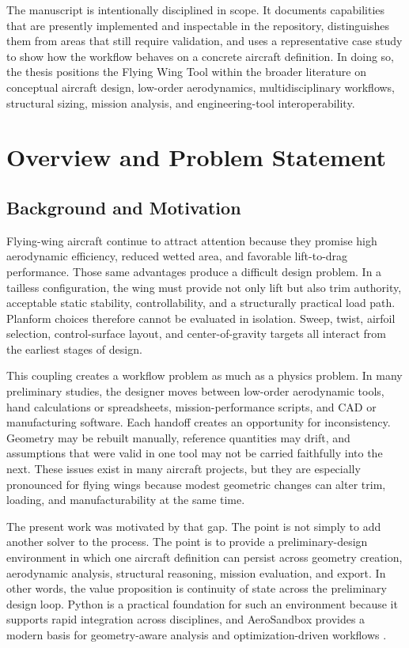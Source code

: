 \documentclass[12pt]{report}
\begin{document}
The manuscript is intentionally disciplined in scope. It documents capabilities that are presently implemented and inspectable in the repository, distinguishes them from areas that still require validation, and uses a representative case study to show how the workflow behaves on a concrete aircraft definition. In doing so, the thesis positions the Flying Wing Tool within the broader literature on conceptual aircraft design, low-order aerodynamics, multidisciplinary workflows, structural sizing, mission analysis, and engineering-tool interoperability.

\tableofcontents
\listoffigures
\listoftables

\clearpage
{}

\chapter{Overview and Problem Statement}
\section{Background and Motivation}
Flying-wing aircraft continue to attract attention because they promise high aerodynamic efficiency, reduced wetted area, and favorable lift-to-drag performance. Those same advantages produce a difficult design problem. In a tailless configuration, the wing must provide not only lift but also trim authority, acceptable static stability, controllability, and a structurally practical load path. Planform choices therefore cannot be evaluated in isolation. Sweep, twist, airfoil selection, control-surface layout, and center-of-gravity targets all interact from the earliest stages of design.

This coupling creates a workflow problem as much as a physics problem. In many preliminary studies, the designer moves between low-order aerodynamic tools, hand calculations or spreadsheets, mission-performance scripts, and CAD or manufacturing software. Each handoff creates an opportunity for inconsistency. Geometry may be rebuilt manually, reference quantities may drift, and assumptions that were valid in one tool may not be carried faithfully into the next. These issues exist in many aircraft projects, but they are especially pronounced for flying wings because modest geometric changes can alter trim, loading, and manufacturability at the same time.

The present work was motivated by that gap. The point is not simply to add another solver to the process. The point is to provide a preliminary-design environment in which one aircraft definition can persist across geometry creation, aerodynamic analysis, structural reasoning, mission evaluation, and export. In other words, the value proposition is continuity of state across the preliminary design loop. Python is a practical foundation for such an environment because it supports rapid integration across disciplines, and AeroSandbox provides a modern basis for geometry-aware analysis and optimization-driven workflows \cite{Sharpe2021AeroSandbox,Sharpe2024Graph}.
\end{document}
